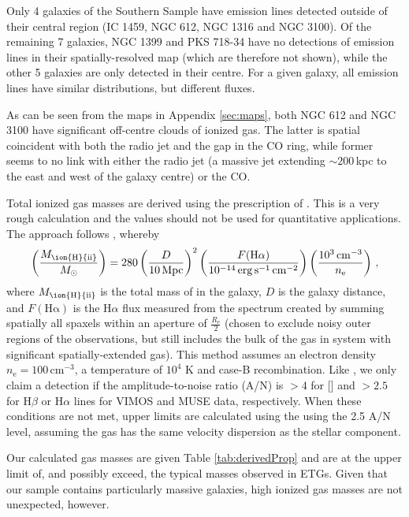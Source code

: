 \documentclass[a4paper,fleqn,usenatbib]{mnras}
\begin{document}
	Only 4 galaxies of the Southern Sample have emission lines detected outside of their central region (IC 1459, NGC 612, NGC 1316 and NGC 3100). Of the remaining 7 galaxies, NGC 1399 and PKS 718-34 have no detections of emission lines in their spatially-resolved map (which are therefore not shown), while the other 5 galaxies are only detected in their centre. For a given galaxy, all emission lines have similar distributions, but different fluxes.

	As can be seen from the maps in Appendix \ref{sec:maps}, both NGC 612 and NGC 3100 have significant off-centre clouds of ionized gas. The latter is spatial coincident with both the radio jet and the gap in the CO ring, while former seems to no link with either the radio jet (a massive jet extending $\sim 200$\,kpc to the east and west of the galaxy centre) or the CO. 


	




	Total ionized gas masses are derived using the prescription of \citet{Sarzi2005}. This is a very rough calculation and the values should not be used for quantitative applications. The approach follows \citet{Kim1989}, whereby
	\begin{equation}
		\left(\frac{M_\text{\ion{H}{ii}}}{M_\odot}\right) = 280 \left(\frac{D}{10\, \mathrm{Mpc}}\right)^2 \left(\frac{F(\mathrm{H\alpha})}{10^{-14} \, \mathrm{erg \, s^{-1} \, cm^{-2}}}\right) \left(\frac{10^3 \, \mathrm{cm^{-3}}}{n_\mathrm{e}}\right) \, ,
	\end{equation}
	where $M_\text{\ion{H}{ii}}$ is the total mass of  in the galaxy, $D$ is the galaxy distance, and $F(\mathrm{H\alpha})$ is the H$\alpha$ flux measured from the spectrum created by summing spatially all spaxels within an aperture of $\frac{R_\mathrm{e}}{2}$ (chosen to exclude noisy outer regions of the observations, but still includes the bulk of the gas in system with significant spatially-extended gas). This method assumes an electron density $n_\mathrm{e} = 100 \, \mathrm{cm^{-3}}$, a temperature of $10^4$ K and case-B recombination. Like \citet{Sarzi2005}, we only claim a detection if the amplitude-to-noise ratio (A/N) is $>4$ for [] and $>2.5$ for H$\beta$ or H$\alpha$ lines for VIMOS and MUSE data, respectively. When these conditions are not met, upper limits are calculated using the using the 2.5 A/N level, assuming the gas has the same velocity dispersion as the stellar component.

	Our calculated gas masses are given Table \ref{tab:derivedProp} and are at the upper limit of, and possibly exceed, the typical masses observed in ETGs. Given that our sample contains particularly massive galaxies, high ionized gas masses are not unexpected, however.
\end{document}
